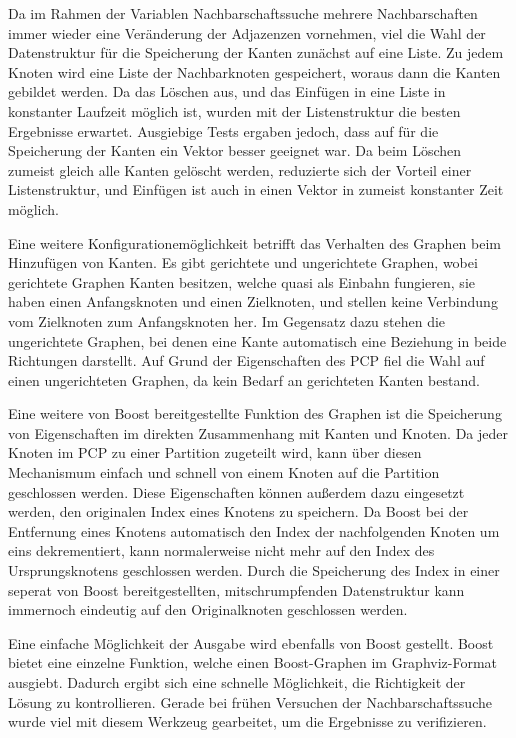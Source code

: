 Da im Rahmen der Variablen Nachbarschaftssuche mehrere Nachbarschaften immer wieder eine Veränderung der Adjazenzen vornehmen, viel die Wahl der Datenstruktur für die Speicherung der Kanten zunächst auf eine
Liste. Zu jedem Knoten wird eine Liste der Nachbarknoten gespeichert, woraus dann die Kanten gebildet werden. Da das Löschen aus, und das Einfügen in eine Liste in konstanter Laufzeit möglich ist, wurden
mit der Listenstruktur die besten Ergebnisse erwartet. Ausgiebige Tests ergaben jedoch, dass auf für die Speicherung der Kanten ein Vektor besser geeignet war. Da beim Löschen zumeist gleich alle
Kanten gelöscht werden, reduzierte sich der Vorteil einer Listenstruktur, und Einfügen ist auch in einen Vektor in zumeist konstanter Zeit möglich. 

Eine weitere Konfigurationemöglichkeit betrifft das Verhalten des Graphen beim Hinzufügen von Kanten. Es gibt gerichtete und ungerichtete Graphen, wobei gerichtete Graphen Kanten besitzen, welche quasi
als Einbahn fungieren, sie haben einen Anfangsknoten und einen Zielknoten, und stellen keine Verbindung vom Zielknoten zum Anfangsknoten her. Im Gegensatz dazu stehen die ungerichtete Graphen, bei denen
eine Kante automatisch eine Beziehung in beide Richtungen darstellt. Auf Grund der Eigenschaften des PCP fiel die Wahl auf einen ungerichteten Graphen, da kein Bedarf an gerichteten Kanten bestand.

Eine weitere von Boost bereitgestellte Funktion des Graphen ist die Speicherung von Eigenschaften im direkten Zusammenhang mit Kanten und Knoten. Da jeder Knoten im PCP zu einer Partition zugeteilt wird, kann
über diesen Mechanismum einfach und schnell von einem Knoten auf die Partition geschlossen werden. Diese Eigenschaften können außerdem dazu eingesetzt werden, den originalen Index eines Knotens zu speichern.
Da Boost bei der Entfernung eines Knotens automatisch den Index der nachfolgenden Knoten um eins dekrementiert, kann normalerweise nicht mehr auf den Index des Ursprungsknotens geschlossen werden. Durch
die Speicherung des Index in einer seperat von Boost bereitgestellten, mitschrumpfenden Datenstruktur kann immernoch eindeutig auf den Originalknoten geschlossen werden. 

Eine einfache Möglichkeit der Ausgabe wird ebenfalls von Boost gestellt. Boost bietet eine einzelne Funktion, welche einen Boost-Graphen im Graphviz-Format ausgiebt. Dadurch ergibt sich eine schnelle 
Möglichkeit, die Richtigkeit der Lösung zu kontrollieren. Gerade bei frühen Versuchen der Nachbarschaftssuche wurde viel mit diesem Werkzeug gearbeitet, um die Ergebnisse zu verifizieren. 

